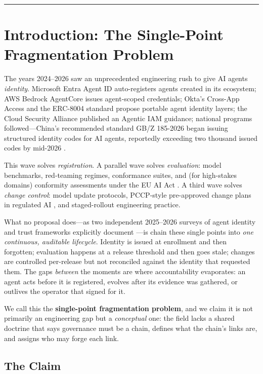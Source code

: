 \documentclass[12pt]{article}
\begin{document}
\begin{center}\rule{0.9\textwidth}{0.4pt}\end{center}

\section{Introduction: The Single-Point Fragmentation Problem}

The years 2024--2026 saw an unprecedented engineering rush to give AI agents \emph{identity}. Microsoft Entra Agent ID auto-registers agents created in its ecosystem; AWS Bedrock AgentCore issues agent-scoped credentials; Okta's Cross-App Access and the ERC-8004 standard propose portable agent identity layers; the Cloud Security Alliance published an Agentic IAM guidance; national programs followed---China's recommended standard GB/Z 185-2026 began issuing structured identity codes for AI agents, reportedly exceeding two thousand issued codes by mid-2026 \cite{gbz185,agentrace}.

This wave solves \emph{registration}. A parallel wave solves \emph{evaluation}: model benchmarks, red-teaming regimes, conformance suites, and (for high-stakes domains) conformity assessments under the EU AI Act \cite{euaiact}. A third wave solves \emph{change control}: model update protocols, PCCP-style pre-approved change plans in regulated AI \cite{pccp}, and staged-rollout engineering practice.

What no proposal does---as two independent 2025--2026 surveys of agent identity and trust frameworks explicitly document \cite{survey2508,survey2604}---is chain these single points into \emph{one continuous, auditable lifecycle}. Identity is issued at enrollment and then forgotten; evaluation happens at a release threshold and then goes stale; changes are controlled per-release but not reconciled against the identity that requested them. The gaps \emph{between} the moments are where accountability evaporates: an agent acts before it is registered, evolves after its evidence was gathered, or outlives the operator that signed for it.

We call this the \textbf{single-point fragmentation problem}, and we claim it is not primarily an engineering gap but a \emph{conceptual} one: the field lacks a shared doctrine that says governance must be a chain, defines what the chain's links are, and assigns who may forge each link.

\subsection{The Claim}
\end{document}
